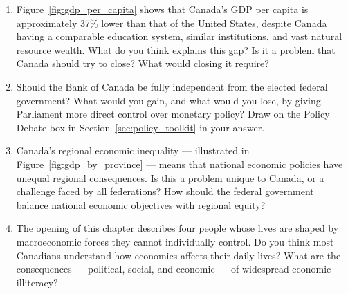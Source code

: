 \begin{enumerate}

\item Figure~\ref{fig:gdp_per_capita} shows that Canada's GDP per capita
is approximately 37\% lower than that of the United States, despite
Canada having a comparable education system, similar institutions, and
vast natural resource wealth. What do you think explains this gap?
Is it a problem that Canada should try to close? What would closing
it require?

\item Should the Bank of Canada be fully independent from the elected
federal government? What would you gain, and what would you lose,
by giving Parliament more direct control over monetary policy?
Draw on the Policy Debate box in Section~\ref{sec:policy_toolkit}
in your answer.

\item Canada's regional economic inequality --- illustrated in
Figure~\ref{fig:gdp_by_province} --- means that national economic
policies have unequal regional consequences. Is this a problem
unique to Canada, or a challenge faced by all federations?
How should the federal government balance national economic objectives
with regional equity?

\item The opening of this chapter describes four people whose lives
are shaped by macroeconomic forces they cannot individually control.
Do you think most Canadians understand how economics affects their
daily lives? What are the consequences --- political, social, and
economic --- of widespread economic illiteracy?

\end{enumerate}
